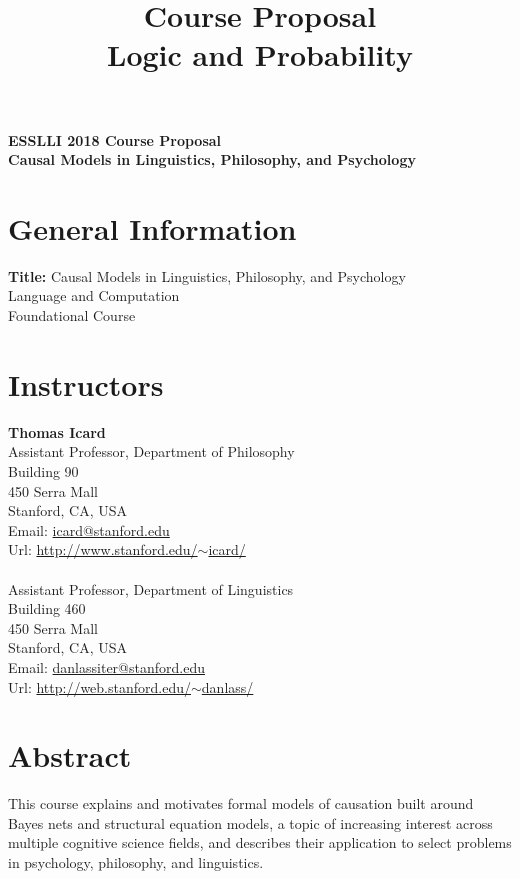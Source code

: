\documentclass[english]{article}
\begin{document}
\title{\Large{ Course Proposal} \\ \Large{\bf Logic and Probability}}
\author{}
\date{}

\noindent \Large{\bf ESSLLI 2018 Course Proposal} \\ \large{\bf Causal Models in Linguistics, Philosophy, and Psychology} 

\section*{\large{General Information}}

\normalsize{{\bf Title:} Causal Models in Linguistics, Philosophy, and Psychology \\
 Language and Computation \\
 Foundational Course}

\section*{\large{Instructors}}

\normalsize{ {\bf Thomas Icard}\\
Assistant Professor, Department of Philosophy \\
Building 90 \\
450 Serra Mall \\
Stanford, CA, USA \\
Email: \href{icard@stanford.edu}{icard@stanford.edu}\\
Url: \href{http://www.stanford.edu/~icard/}{http://www.stanford.edu/$\sim$icard/} \\

\\
Assistant Professor, Department of Linguistics \\
Building 460 \\
450 Serra Mall \\
Stanford, CA, USA \\
Email: \href{danlassiter@stanford.edu}{danlassiter@stanford.edu}\\
Url: \href{http://web.stanford.edu/~danlass/}{http://web.stanford.edu/$\sim$danlass/}}

\section*{\large{Abstract}}

This course explains and motivates formal models of causation built around Bayes nets and structural equation models, a topic of increasing interest across multiple cognitive science fields, and describes their application to select problems in psychology, philosophy, and linguistics. 
\end{document}

